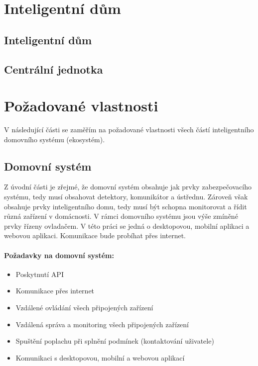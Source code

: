 \documentclass[FM,DP]{tulthesis}  %
\begin{document}

\section{Inteligentní dům}

\subsection{Inteligentní dům}

\subsection{Centrální jednotka}


\section{Požadované vlastnosti}
V následující části se zaměřím na požadované vlastnosti všech částí inteligentního domovního systému (ekosystém).

\subsection{Domovní systém}
Z úvodní části je zřejmé, že domovní systém obsahuje jak prvky zabezpečovacího systému, tedy musí obsahovat detektory, komunikátor a ústřednu. Zároveň však obsahuje prvky inteligentního domu, tedy musí být schopna monitorovat a řídit různá zařízení v domácnosti. V rámci domovního systému jsou výše zmíněné prvky řízeny ovladačem. V této práci se jedná o desktopovou, mobilní aplikaci a webovou aplikaci. Komunikace bude probíhat přes internet.

\paragraph{Požadavky na domovní systém:}
\begin{itemize}
\item Poskytnutí API
\item Komunikace přes internet
\item Vzdálené ovládání všech připojených zařízení
\item Vzdálená správa a monitoring všech připojených zařízení
\item Spuštění poplachu při splnění podmínek (kontaktování uživatele)
\item Komunikaci s desktopovou, mobilní a webovou aplikací
\end{itemize}
\end{document}
